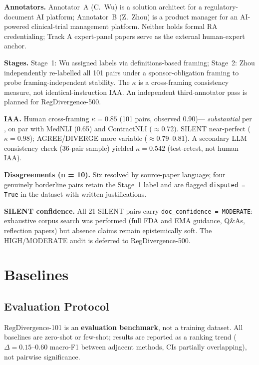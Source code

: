 \documentclass[manuscript]{acmart}
\begin{document}
\begin{revblock}
\textbf{Annotators.} Annotator~A (C.~Wu) is a solution architect for a
regulatory-document AI platform; Annotator~B (Z.~Zhou) is a product manager for
an AI-powered clinical-trial management platform. Neither holds formal RA
credentialing; Track A expert-panel papers serve as the external human-expert
anchor.

\textbf{Stages.} Stage~1: Wu assigned labels via definitions-based framing;
Stage~2: Zhou independently re-labelled all 101 pairs under a sponsor-obligation
framing to probe framing-independent stability. The $\kappa$ is a cross-framing
consistency measure, not identical-instruction IAA. An independent
third-annotator pass is planned for RegDivergence-500.

\textbf{IAA.} Human cross-framing $\kappa = 0.85$ (101 pairs, observed 0.90)---%
\textit{substantial} per \citet{landis1977kappa}, on par with MedNLI (0.65)
and ContractNLI ($\approx$0.72). SILENT near-perfect ($\kappa = 0.98$);
AGREE/DIVERGE more variable ($\approx$0.79--0.81). A secondary LLM
consistency check (36-pair sample) yielded $\kappa = 0.542$ (test-retest,
not human IAA).

\textbf{Disagreements (n = 10).} Six resolved by source-paper language; four
genuinely borderline pairs retain the Stage~1 label and are flagged
\texttt{disputed = True} in the dataset with written justifications.

\textbf{SILENT confidence.} All 21 SILENT pairs carry
\texttt{doc\_confidence = MODERATE}: exhaustive corpus search was performed
(full FDA and EMA guidance, Q\&As, reflection papers) but absence claims remain
epistemically soft. The HIGH/MODERATE audit is deferred to RegDivergence-500.
\end{revblock}

\section{Baselines}

\subsection{Evaluation Protocol}
\label{sec:eval_context}

\begin{revblock}
RegDivergence-101 is an \textbf{evaluation benchmark}, not a training dataset.
All baselines are zero-shot or few-shot; results are reported as a ranking trend
($\Delta = 0.15$--$0.60$ macro-F1 between adjacent methods, CIs partially
overlapping), not pairwise significance.
\end{revblock}
\end{document}
